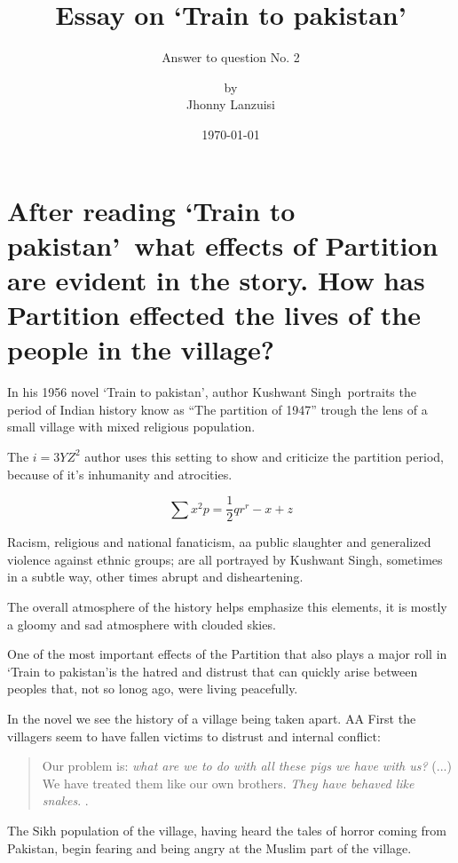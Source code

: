 \documentclass{scrartcl}
\begin{document}
%
\newcommand{\tpak}{`Train to pakistan'}
\newcommand{\ks}{Kushwant Singh}
\title{Essay on \tpak}
\subtitle{Answer to question No. 2}
\subject{IDE 143---El mundo de la literatura en inglés}
\titlehead{Universidad Simón Bolívar\hfill Caracas, Venezuela}
\author{by \\ Jhonny Lanzuisi}
\date{\today}
\maketitle

\section*{After reading \tpak\ what effects of Partition are evident in the story. How has Partition effected the lives of the people in the village?}
\label{sec:question}

In his 1956 novel \tpak \cite{khushwant_singh_train_1990},
author \ks\ portraits the period of Indian history know
as ``The partition of 1947'' trough the lens of a small village
with mixed religious population.

The \( i = 3YZ^2\) author uses this setting to show and criticize
the partition period, because of it's inhumanity and
atrocities.

\[ \sum x^2 p = \frac12 qr^r - x + z\]

Racism, religious and national fanaticism, aa
public slaughter and generalized violence against ethnic groups;
are all portrayed by \ks, sometimes in a subtle way,
other times abrupt and disheartening.

The overall atmosphere of the history
helps emphasize this elements,
it is mostly a gloomy and sad atmosphere
with clouded skies.

One of the most important effects of the Partition
that also plays a major roll in \tpak is
the hatred and distrust that can quickly arise
between peoples that, not so lonog ago,
were living peacefully.

In the novel we see the history of a village
being taken apart. AA
First the villagers seem to have fallen victims
to distrust and internal conflict:
\begin{quote}
  Our problem is: \emph{what are we to do with all
    these pigs we have with us?} (...) We have treated them
  like our own brothers. \emph{They have behaved like snakes}.
  \cite[p. 171, para. 6, emphasis added by me]{khushwant_singh_train_1990}.
\end{quote}
The Sikh population of the village,
having heard the tales of horror coming from Pakistan,
begin fearing and being angry at the Muslim part of the village.
\end{document}
